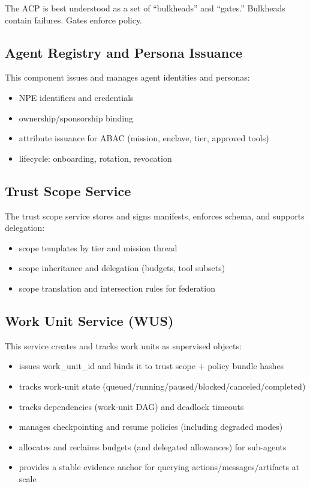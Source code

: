\documentclass[11pt]{article}
\begin{document}
The ACP is best understood as a set of ``bulkheads'' and ``gates.''
Bulkheads contain failures. Gates enforce policy.

\hypertarget{agent-registry-and-persona-issuance}{%
\subsection{Agent Registry and Persona Issuance}\label{agent-registry-and-persona-issuance}}

This component issues and manages agent identities and personas:

\begin{itemize}
\tightlist
\item
  NPE identifiers and credentials
\item
  ownership/sponsorship binding
\item
  attribute issuance for ABAC (mission, enclave, tier, approved tools)
\item
  lifecycle: onboarding, rotation, revocation
\end{itemize}

\hypertarget{trust-scope-service}{%
\subsection{Trust Scope Service}\label{trust-scope-service}}

The trust scope service stores and signs manifests, enforces schema, and
supports delegation:

\begin{itemize}
\tightlist
\item
  scope templates by tier and mission thread
\item
  scope inheritance and delegation (budgets, tool subsets)
\item
  scope translation and intersection rules for federation
\end{itemize}

\hypertarget{work-unit-service-wus}{%
\subsection{Work Unit Service (WUS)}\label{work-unit-service-wus}}

This service creates and tracks work units as supervised objects:

\begin{itemize}
\tightlist
\item
  issues work\_unit\_id and binds it to trust scope + policy bundle
  hashes
\item
  tracks work-unit state
  (queued/running/paused/blocked/canceled/completed)
\item
  tracks dependencies (work-unit DAG) and deadlock timeouts
\item
  manages checkpointing and resume policies (including degraded modes)
\item
  allocates and reclaims budgets (and delegated allowances) for
  sub-agents
\item
  provides a stable evidence anchor for querying
  actions/messages/artifacts at scale
\end{itemize}
\end{document}
